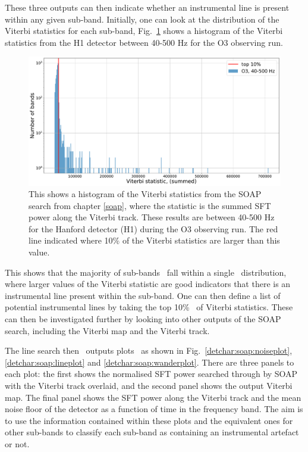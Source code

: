 These three outputs can then indicate whether an instrumental line is present within any given sub-band.
Initially, one can look at the distribution of the Viterbi statistics for each sub-band, Fig.~\ref{detchar:soap:rankedstats} shows a histogram of the Viterbi statistics from the H1 detector between 40-500 Hz for the O3 observing run.
%
\begin{figure}[ht]
	\centering
	\includegraphics[width=\textwidth]{C6_detchar/statistic_hists_O3_H1.pdf}
        \caption[Viterbi statistics for H1 in O3, 40-500 Hz]{This shows a
histogram of the Viterbi statistics from the SOAP search from chapter
\ref{soap}, where the statistic is the summed \gls{SFT}  power along the
Viterbi track. These results are between 40-500 Hz for the Hanford detector
(H1) during the O3 observing run. The red line indicated where 10\% of the
Viterbi statistics are larger than this value.~ }
\label{detchar:soap:rankedstats}

\end{figure}
%
This shows that the majority of sub-bands~ fall within
a single~ distribution,
where larger values of the Viterbi statistic are good indicators that there is
an instrumental line present within the sub-band.  One can then define a list of
potential instrumental lines by taking the top 10\%~ of Viterbi statistics.
These can then be investigated further by looking into other outputs of the
SOAP search, including the Viterbi map and the Viterbi track.

%
The line search then~ outputs
plots~ as shown in Fig.~\ref{detchar:soap:noiseplot},
\ref{detchar:soap:lineplot} and \ref{detchar:soap:wanderplot}.  There are three
panels to each plot: the first shows the normalised \gls{SFT} power searched
through by SOAP with the Viterbi track overlaid, and the second panel shows the
output Viterbi map.  The final panel shows the \gls{SFT} power along the
Viterbi track and the mean noise floor of the detector as a function of time in
the frequency band.  The aim is to use the information contained within these
plots and the equivalent ones for other sub-bands to classify each sub-band as
containing an instrumental artefact or not. 

